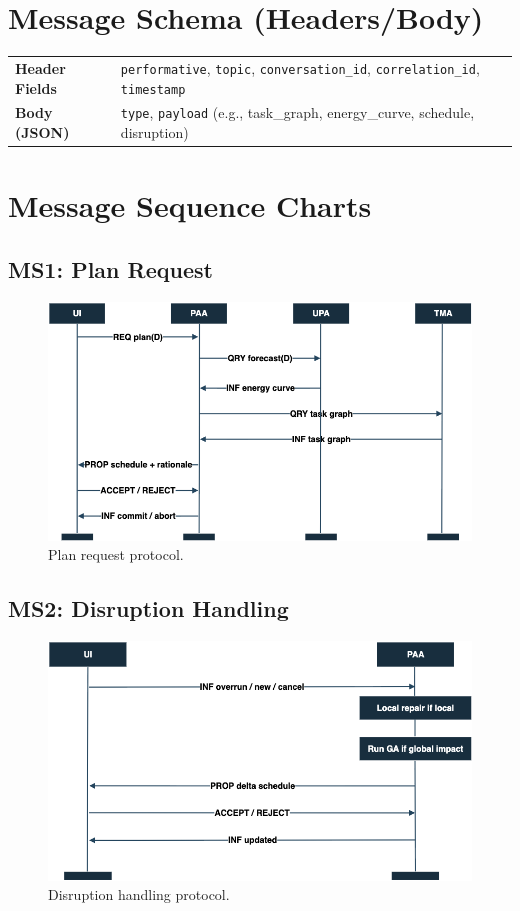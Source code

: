 \documentclass[12pt,oneside]{report}
\begin{document}
\section{Message Schema (Headers/Body)}
\begin{tabularx}{\textwidth}{@{}p{3.2cm}X@{}}
\toprule
\textbf{Header Fields} & \texttt{performative}, \texttt{topic}, \texttt{conversation\_id}, \texttt{correlation\_id}, \texttt{timestamp} \\
\textbf{Body (JSON)} & \texttt{type}, \texttt{payload} (e.g., task\_graph, energy\_curve, schedule, disruption) \\
\bottomrule
\end{tabularx}

\section{Message Sequence Charts}
\subsection*{MS1: Plan Request}
\begin{figure}[h!]
\centering
\includegraphics[width=1\textwidth]{Plan request protocol.png}
\caption{Plan request protocol.}
\label{fig:msc-plan}
\end{figure}


\subsection*{MS2: Disruption Handling}
\begin{figure}[h!]
\centering
\includegraphics[width=1\textwidth]{msc-disruption-handling.png}
\caption{Disruption handling protocol.}
\label{fig:msc-disruption}
\end{figure}
\end{document}
